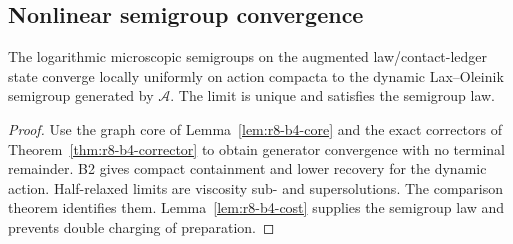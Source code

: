 \subsection{Nonlinear semigroup convergence}

\begin{theorem}
\label{thm:r8-b4-convergence}
The logarithmic microscopic semigroups on the augmented law/contact-ledger state
converge locally uniformly on action compacta to the dynamic Lax--Oleinik
semigroup generated by $\mathcal A$.  The limit is unique and satisfies the
semigroup law.
\end{theorem}

\begin{proof}
Use the graph core of Lemma~\ref{lem:r8-b4-core} and the exact correctors of
Theorem~\ref{thm:r8-b4-corrector} to obtain generator convergence with no
terminal remainder.  B2 gives compact containment and lower recovery for the
dynamic action.  Half-relaxed limits are viscosity sub- and supersolutions.
The comparison theorem identifies them.  Lemma~\ref{lem:r8-b4-cost} supplies
the semigroup law and prevents double charging of preparation.
\end{proof}
